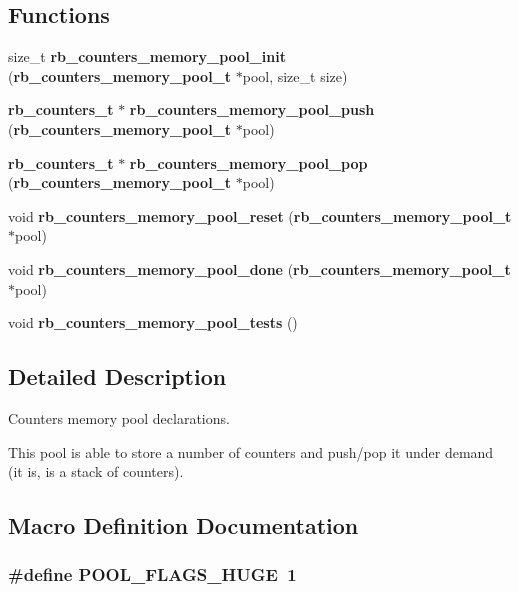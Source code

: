 \subsection*{Functions}
\begin{DoxyCompactItemize}
\item 
size\+\_\+t {\bf rb\+\_\+counters\+\_\+memory\+\_\+pool\+\_\+init} ({\bf rb\+\_\+counters\+\_\+memory\+\_\+pool\+\_\+t} $\ast$pool, size\+\_\+t size)
\item 
{\bf rb\+\_\+counters\+\_\+t} $\ast$ {\bf rb\+\_\+counters\+\_\+memory\+\_\+pool\+\_\+push} ({\bf rb\+\_\+counters\+\_\+memory\+\_\+pool\+\_\+t} $\ast$pool)
\item 
{\bf rb\+\_\+counters\+\_\+t} $\ast$ {\bf rb\+\_\+counters\+\_\+memory\+\_\+pool\+\_\+pop} ({\bf rb\+\_\+counters\+\_\+memory\+\_\+pool\+\_\+t} $\ast$pool)
\item 
void {\bf rb\+\_\+counters\+\_\+memory\+\_\+pool\+\_\+reset} ({\bf rb\+\_\+counters\+\_\+memory\+\_\+pool\+\_\+t} $\ast$pool)
\item 
void {\bf rb\+\_\+counters\+\_\+memory\+\_\+pool\+\_\+done} ({\bf rb\+\_\+counters\+\_\+memory\+\_\+pool\+\_\+t} $\ast$pool)
\item 
void {\bf rb\+\_\+counters\+\_\+memory\+\_\+pool\+\_\+tests} ()
\end{DoxyCompactItemize}


\subsection{Detailed Description}
Counters memory pool declarations. 

This pool is able to store a number of counters and push/pop it under demand (it is, is a stack of counters). 

\subsection{Macro Definition Documentation}
\subsubsection[{P\+O\+O\+L\+\_\+\+F\+L\+A\+G\+S\+\_\+\+H\+U\+G\+E}]{\setlength{\rightskip}{0pt plus 5cm}\#define P\+O\+O\+L\+\_\+\+F\+L\+A\+G\+S\+\_\+\+H\+U\+G\+E~1}\label{rb__counters__memory__pool_8h_afbb1fa1465a941426aac1d6cc66fc6b4}


